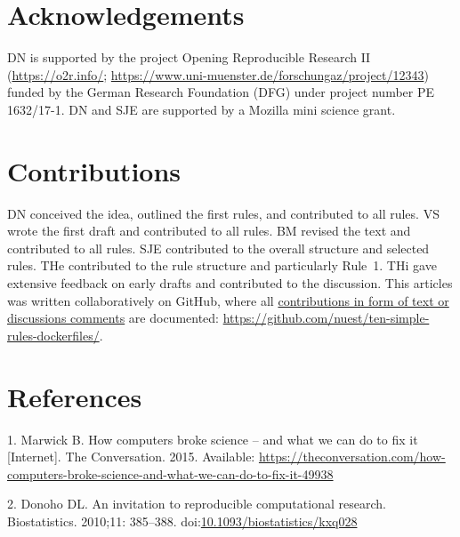 \documentclass[10pt,letterpaper]{article}
\begin{document}
\hypertarget{acknowledgements}{%
\section*{Acknowledgements}\label{acknowledgements}}

DN is supported by the project Opening Reproducible Research II
(\href{https://o2r.info/}{https://o2r.info/};
\href{https://www.uni-muenster.de/forschungaz/project/12343}{https://www.uni-muenster.de/forschungaz/project/12343})
funded by the German Research Foundation (DFG) under project number PE
1632/17-1. DN and SJE are supported by a Mozilla mini science grant.

\hypertarget{contributions}{%
\section*{Contributions}\label{contributions}}

DN conceived the idea, outlined the first rules, and contributed to all
rules. VS wrote the first draft and contributed to all rules. BM revised
the text and contributed to all rules. SJE contributed to the overall
structure and selected rules. THe contributed to the rule structure and
particularly Rule~1. THi gave extensive feedback on early drafts and
contributed to the discussion. This articles was written collaboratively
on GitHub, where all
\href{https://github.com/nuest/ten-simple-rules-dockerfiles/graphs/contributors}{contributions
in form of text or discussions comments} are documented:
\url{https://github.com/nuest/ten-simple-rules-dockerfiles/}.

\hypertarget{references}{%
\section*{References}\label{references}}

\hypertarget{refs}{}
\leavevmode\hypertarget{ref-marwick_how_2015}{}%
1. Marwick B. How computers broke science -- and what we can do to fix
it {[}Internet{]}. The Conversation. 2015. Available:
\url{https://theconversation.com/how-computers-broke-science-and-what-we-can-do-to-fix-it-49938}

\leavevmode\hypertarget{ref-donoho_invitation_2010}{}%
2. Donoho DL. An invitation to reproducible computational research.
Biostatistics. 2010;11: 385--388.
doi:\href{https://doi.org/10.1093/biostatistics/kxq028}{10.1093/biostatistics/kxq028}
\end{document}
